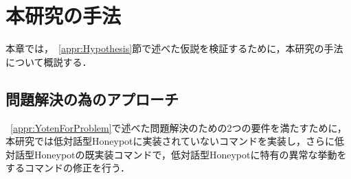 \chapter{本研究の手法}
\label{meth}

本章では，~\ref{appr:Hypothesis}節で述べた仮説を検証するために，本研究の手法について概説する．

\section{問題解決の為のアプローチ}
\label{meth:appr}
 ~\ref{appr:YotenForProblem}で述べた問題解決のための2つの要件を満たすために，本研究では低対話型Honeypotに実装されていないコマンドを実装し，さらに低対話型Honeypotの既実装コマンドで，低対話型Honeypotに特有の異常な挙動をするコマンドの修正を行う．


%



